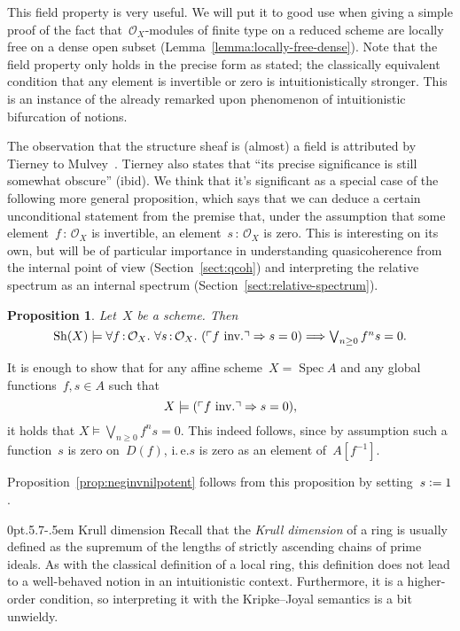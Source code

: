 \documentclass[10pt,reqno,a4paper]{amsbook}
\makeatletter
\theoremstyle{definition}
\theoremstyle{plain}
\newtheorem{prop}[defn]{Proposition}
\theoremstyle{remark}
\renewcommand{\O}{\mathcal{O}}
\newcommand{\Sh}{\mathrm{Sh}}
\DeclareMathOperator{\Spec}{Spec}
\newcommand{\?}{\,{:}\,}
\renewcommand{\_}{\mathpunct{.}\,}
\newcommand{\speak}[1]{\ulcorner\text{\textnormal{#1}}\urcorner}
\newcommand{\ie}{i.\,e.\@\xspace}
\newcommand{\inv}{inv.\@}
\newcommand{\defeq}{\vcentcolon=}
\renewenvironment{proof}[1][\proofname]{\par
  \pushQED{\qed}%
  \normalfont \topsep6\p@\@plus6\p@\relax
  \trivlist
  \item[\hskip\labelsep
        \itshape
    #1\@addpunct{.}]\ignorespaces
}{%
  \popQED\endtrivlist\@endpefalse
}
\def\subsection{\@startsection{subsection}{2}%
  {0pt}{.5\linespacing\@plus.7\linespacing}{-.5em}%
  {\normalfont\bfseries}}
\makeatother
\begin{document}
This field property is very useful. We will put it to good use when giving a
simple proof of the fact that~$\O_X$-modules of finite type on a reduced scheme
are locally free on a dense open subset (Lemma~\ref{lemma:locally-free-dense}).
Note that the field property only holds in the precise form as stated;
the classically equivalent condition that any element is invertible or zero is
intuitionistically stronger. This is an instance of the already remarked upon
phenomenon of intuitionistic bifurcation of notions.

The observation that the structure sheaf is (almost) a field is attributed by
Tierney to Mulvey~\cite[p.~209]{tierney:spectrum}.
Tierney also states that ``its precise significance is still somewhat
obscure'' (ibid). We think that it's significant as a special case of the
following more general proposition,
which says that we can deduce a certain unconditional
statement from the premise that, under the assumption that some element~$f\?\O_X$ is invertible, an element~$s\?\O_X$ is zero. This is
interesting on its own, but will be of particular importance in understanding
quasicoherence from the internal point of view (Section~\ref{sect:qcoh}) and
interpreting the relative spectrum as an internal spectrum
(Section~\ref{sect:relative-spectrum}).

\begin{prop}\label{prop:cond-zero}
Let~$X$ be a scheme. Then
\[ \Sh(X) \models
  \forall f\?\O_X\_
  \forall s\?\O_X\_
  (\speak{$f$ \inv} \Rightarrow s = 0) \Longrightarrow
  \textstyle
  \bigvee_{n \geq 0} f^n s = 0. \]
\end{prop}
\begin{proof}It is enough to show that for any affine scheme~$X = \Spec A$ and
any global functions~$f, s \in A$ such that
\[ X \models (\speak{$f$ \inv} \Rightarrow s = 0), \]
it holds that $X \models \textstyle \bigvee_{n \geq 0} f^n s = 0$. This
indeed follows, since by assumption such a function~$s$ is zero on~$D(f)$, \ie $s$
is zero as an element of~$A[f^{-1}]$.
\end{proof}

Proposition~\ref{prop:neginvnilpotent} follows from this proposition by
setting~$s \defeq 1$.


\subsection{Krull dimension}\label{sect:krull-dimension}
Recall that the \emph{Krull dimension} of a
ring is usually defined as the supremum of the lengths of strictly
ascending chains of prime ideals. As with the classical definition of a local ring,
this definition does not lead to a well-behaved notion in an intuitionistic
context. Furthermore, it is a higher-order condition, so interpreting it
with the Kripke--Joyal semantics is a bit unwieldy.
\end{document}
